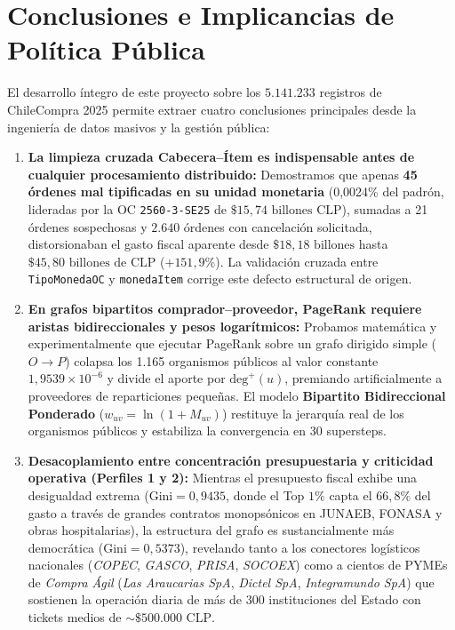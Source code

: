 \documentclass[11pt,a4paper]{article}
\begin{document}
\section{Conclusiones e Implicancias de Política Pública}

El desarrollo íntegro de este proyecto sobre los $5.141.233$ registros de ChileCompra 2025 permite extraer cuatro conclusiones principales desde la ingeniería de datos masivos y la gestión pública:

\begin{enumerate}
    \item \textbf{La limpieza cruzada Cabecera--Ítem es indispensable antes de cualquier procesamiento distribuido:} Demostramos que apenas \textbf{45 órdenes mal tipificadas en su unidad monetaria} (0,0024\% del padrón, lideradas por la OC \texttt{2560-3-SE25} de $\$15,74\text{ billones CLP}$), sumadas a 21 órdenes sospechosas y $2.640$ órdenes con cancelación solicitada, distorsionaban el gasto fiscal aparente desde $\$18,18\text{ billones}$ hasta $\$45,80\text{ billones de CLP}$ ($+151,9\%$). La validación cruzada entre \texttt{TipoMonedaOC} y \texttt{monedaItem} corrige este defecto estructural de origen.
    \item \textbf{En grafos bipartitos comprador--proveedor, PageRank requiere aristas bidireccionales y pesos logarítmicos:} Probamos matemática y experimentalmente que ejecutar PageRank sobre un grafo dirigido simple ($O \to P$) colapsa los 1.165 organismos públicos al valor constante $1,9539 \times 10^{-6}$ y divide el aporte por $\text{deg}^+(u)$, premiando artificialmente a proveedores de reparticiones pequeñas. El modelo \textbf{Bipartito Bidireccional Ponderado} ($w_{uv} = \ln(1 + M_{uv})$) restituye la jerarquía real de los organismos públicos y estabiliza la convergencia en 30 supersteps.
    \item \textbf{Desacoplamiento entre concentración presupuestaria y criticidad operativa (Perfiles 1 y 2):} Mientras el presupuesto fiscal exhibe una desigualdad extrema ($\text{Gini} = 0,9435$, donde el Top $1\%$ capta el $66,8\%$ del gasto a través de grandes contratos monopsónicos en JUNAEB, FONASA y obras hospitalarias), la estructura del grafo es sustancialmente más democrática ($\text{Gini} = 0,5373$), revelando tanto a los conectores logísticos nacionales (\textit{COPEC}, \textit{GASCO}, \textit{PRISA}, \textit{SOCOEX}) como a cientos de PYMEs de \textit{Compra Ágil} (\textit{Las Araucarias SpA}, \textit{Dictel SpA}, \textit{Integramundo SpA}) que sostienen la operación diaria de más de 300 instituciones del Estado con tickets medios de $\sim \$500.000\text{ CLP}$.

\end{enumerate}
\end{document}
